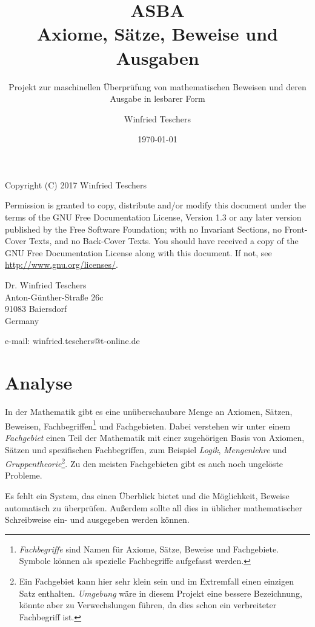 \documentclass[english,ngerman,parskip=half,headsepline,footsepline]{scrreprt}
\title{ASBA\\Axiome, Sätze, Beweise und Ausgaben}
\subtitle{Projekt zur maschinellen Überprüfung von mathematischen Beweisen und deren Ausgabe in lesbarer Form}
\author{Winfried Teschers}
\date{\today}
\begin{document}
	\maketitle
	\tableofcontents	
	\vfill
	Copyright (C) 2017  Winfried Teschers
	
	\vspace{12pt}
	Permission is granted to copy, distribute and/or modify this document under the terms of the GNU Free Documentation License, Version 1.3 or any later version published by the Free Software Foundation; with no Invariant Sections, no Front-Cover Texts, and no Back-Cover Texts. You should have received a copy of the GNU Free Documentation License along with this document.  If not, see \url{http://www.gnu.org/licenses/}.
	\vspace{12pt}
	
	Dr. Winfried Teschers\\
	Anton-Günther-Straße 26c\\
	91083 Baiersdorf\\
	Germany
	
	e-mail: winfried.teschers@t-online.de\par
	
	\thispagestyle{scrheadings}
	
	
	\chapter{Analyse}
	\thispagestyle{scrheadings}
	
	In der Mathematik gibt es eine unüberschaubare Menge an Axiomen, Sätzen, Beweisen, Fachbegriffen\footnote{ \emph{Fachbegriffe} sind Namen für Axiome, Sätze, Beweise und Fachgebiete. Symbole können als spezielle Fachbegriffe aufgefasst werden.} und Fachgebieten. Dabei verstehen wir unter einem \emph{Fachgebiet} einen Teil der Mathematik  mit einer zugehörigen Basis von Axiomen, Sätzen und spezifischen Fachbegriffen, zum Beispiel \emph{Logik}, \emph{Mengenlehre} und \emph{Gruppentheorie}\footnote{ Ein Fachgebiet kann hier sehr klein sein und im Extremfall einen einzigen Satz enthalten. \emph{Umgebung} wäre in diesem Projekt eine bessere Bezeichnung, könnte aber zu Verwechslungen führen, da dies schon ein verbreiteter Fachbegriff ist.}. Zu den meisten Fachgebieten gibt es auch noch ungelöste Probleme.
	
	Es fehlt ein System, das einen Überblick bietet und die Möglichkeit, Beweise automatisch zu überprüfen. Außerdem sollte all dies in üblicher mathematischer Schreibweise ein- und ausgegeben werden können.
	
\end{document}
